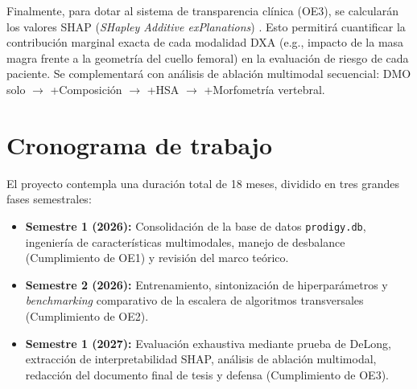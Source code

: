 \documentclass[../tesis.tex]{subfiles}
\begin{document}
Finalmente, para dotar al sistema de transparencia clínica (OE3), se calcularán los valores SHAP (\textit{SHapley Additive exPlanations}) \cite{Lundberg2017}. Esto permitirá cuantificar la contribución marginal exacta de cada modalidad DXA (e.g., impacto de la masa magra frente a la geometría del cuello femoral) en la evaluación de riesgo de cada paciente. Se complementará con análisis de ablación multimodal secuencial: DMO solo $\rightarrow$ +Composición $\rightarrow$ +HSA $\rightarrow$ +Morfometría vertebral.

\section{Cronograma de trabajo}
\label{sec:cronograma}

El proyecto contempla una duración total de 18 meses, dividido en tres grandes fases semestrales:

\begin{itemize}
    \item \textbf{Semestre 1 (2026):} Consolidación de la base de datos \texttt{prodigy.db}, ingeniería de características multimodales, manejo de desbalance (Cumplimiento de OE1) y revisión del marco teórico.
    \item \textbf{Semestre 2 (2026):} Entrenamiento, sintonización de hiperparámetros y \textit{benchmarking} comparativo de la escalera de algoritmos transversales (Cumplimiento de OE2).
    \item \textbf{Semestre 1 (2027):} Evaluación exhaustiva mediante prueba de DeLong, extracción de interpretabilidad SHAP, análisis de ablación multimodal, redacción del documento final de tesis y defensa (Cumplimiento de OE3).
\end{itemize}
\end{document}

